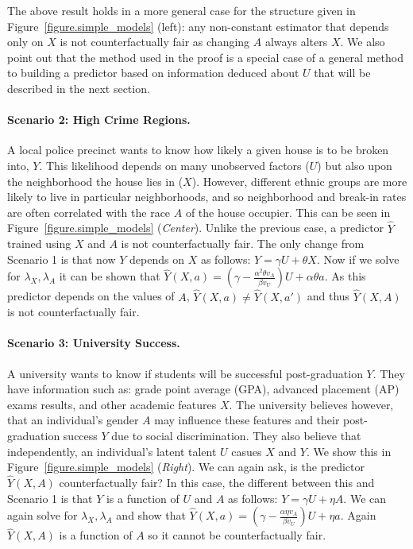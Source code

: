 The above result holds in a more general case for the structure given
in Figure~\ref{figure.simple_models} (left): any non-constant estimator that
depends only on $X$ is not counterfactually fair as changing $A$ always alters $X$.
We also point out that the method used in the proof is a special case
of a general method to building a predictor based on information deduced
about $U$ that will be described in the next section.
%
%
\paragraph{Scenario 2: High Crime Regions.} 
A local police precinct wants to know how likely a given house is to be broken into, $Y$. This likelihood depends on many unobserved factors
($U$) but also upon the neighborhood the house lies in ($X$). However, different ethnic groups are more likely to live in particular neighborhoods, and so neighborhood and break-in rates are often correlated with the 
race $A$ of the house occupier. This can be seen in Figure~\ref{figure.simple_models} (\emph{Center}). Unlike the previous case, a predictor $\hat Y$ trained using $X$ and $A$ is not counterfactually fair. The only change from Scenario 1 is that now $Y$ depends on $X$ as follows: $Y \!=\! \gamma U + \theta X$. Now if we solve for $\lambda_X,\lambda_A$ it can be shown that $\hat Y(X,a) \!=\! (\gamma - \frac{\alpha^2 \theta v_A}{\beta v_U})U + \alpha \theta a$. As this predictor depends on the values of $A$, $\hat Y(X,a) \!\neq\! \hat Y(X,a')$ and thus $\hat Y(X,A)$ is not counterfactually fair.

\paragraph{Scenario 3: University Success.}
A university wants to know if students will be successful post-graduation $Y$. They have information such as: grade point average (GPA), advanced placement (AP) exams results, and other academic features $X$. The university believes however, that an individual's gender $A$ may influence these features and their post-graduation success $Y$ due to social discrimination. They also believe that independently, an individual's latent talent $U$ casues $X$ and $Y$. We show this in Figure~\ref{figure.simple_models} (\emph{Right}). We can again ask, is the predictor $\hat Y(X,A)$ counterfactually fair? In this case, the different between this and Scenario 1 is that $Y$ is a function of $U$ and $A$ as follows: $Y \!=\! \gamma U + \eta A$. We can again solve for $\lambda_X,\lambda_A$ and show that $\hat Y(X,a) \!=\! (\gamma - \frac{\alpha \eta v_A}{\beta v_U})U + \eta a$. Again $\hat Y(X,A)$ is a function of $A$ so it cannot be counterfactually fair.


